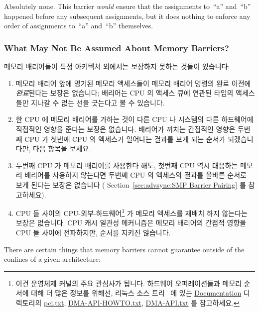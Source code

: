 \begin{enumerate}
{	Absolutely none.  This barrier {\em would} ensure that the
	assignments to~``a'' and~``b'' happened before any subsequent
	assignments, but it does nothing to enforce any order of
	assignments to~``a'' and~``b'' themselves.
	\fi
} \QuickQuizEnd

\subsubsection{What May Not Be Assumed About Memory Barriers?}
\label{sec:advsync:What May Not Be Assumed About Memory Barriers?}

메모리 배리어들이 특정 아키텍쳐 외에서는 보장하지 못하는 것들이 있습니다:

\begin{enumerate}
\item	메모리 배리어 앞에 명기된 메모리 액세스들이 메모리 배리어 명령의 완료
	이전에 \emph{완료}된다는 보장은 없습니다; 배리어는 CPU 의 액세스 큐에
	연관된 타입의 액세스들만 지나갈 수 없는 선을 긋는다고 볼 수 있습니다.
\item	한 CPU 에 메모리 배리어를 가하는 것이 다른 CPU 나 시스템의 다른
	하드웨어에 직접적인 영향을 준다는 보장은 없습니다.
	배리어가 끼치는 간접적인 영향은 두번째 CPU 가 첫번째 CPU 의 액세스가
	일어나는 결과를 보게 되는 순서가 되겠습니다만, 다음 항목을 보세요.
\item	두번째 CPU 가 메모리 배리어를 사용한다 해도, 첫번째 CPU 역시 대응하는
	메모리 배리어를 사용하지 않는다면 두번째 CPU 의 액세스의 결과를 올바른
	순서로 보게 된다는 보장은 없습니다 (
	Section~\ref{sec:advsync:SMP Barrier Pairing} 를 참고하세요).
\item	CPU 들 사이의 CPU-외부-하드웨어\footnote{
		이건 운영체제 커널의 주요 관심사가 됩니다.
		하드웨어 오퍼레이션들과 메모리 순서에 대해 더 많은 정보를
		위해선, 리눅스 소스 트리~\cite{Torvalds2.6kernel} 에 있는
		\url{Documentation} 디렉토리의 \url{pci.txt},
		\url{DMA-API-HOWTO.txt}, \url{DMA-API.txt} 를 참고하세요.}
	가 메모리 액세스를 재배치 하지 않는다는 보장은 없습니다.
	CPU 캐시 일관성 메커니즘은 메모리 배리어의 간접적 영향을 CPU 들 사이에
	전파하지만, 순서를 지키진 않습니다.
\end{enumerate}
\iffalse

There are certain things that memory barriers cannot guarantee outside
of the confines of a given architecture:


\end{enumerate}
